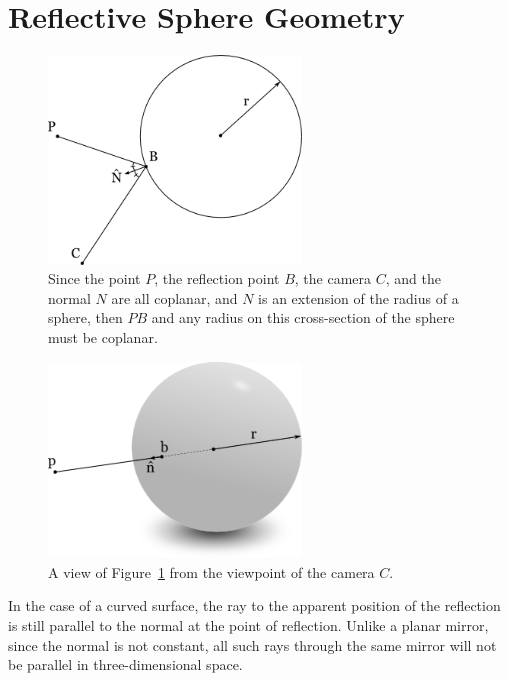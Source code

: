 \documentclass{thesis}
\begin{document}
\section{Reflective Sphere Geometry}
\begin{figure}
	\centering
    	\includegraphics[width=0.6\textwidth]{colinear-radius}
	\caption{Since the point $P$, the reflection point $B$, the camera $C$, and the normal $N$ are all coplanar, and $N$ is an extension of the radius of a sphere, then $PB$ and any radius on this cross-section of the sphere must be coplanar.}
	\label{colinear-radius}
\end{figure}

\begin{figure}
	\centering
    	\includegraphics[width=0.6\textwidth]{colinear-radius-camera-view}
	\caption{A view of Figure~\ref{colinear-radius} from the viewpoint of the camera $C$.}
	\label{colinear-radius-camera-view}
\end{figure}

In the case of a curved surface, the ray to the apparent position of the reflection is still parallel to the normal at the point of reflection. Unlike a planar mirror, since the normal is not constant, all such rays through the same mirror will not be parallel in three-dimensional space.
\end{document}
